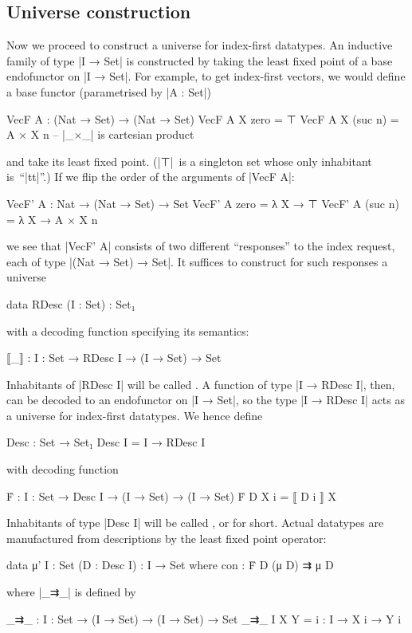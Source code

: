 \subsection{Universe construction}
\label{sec:Desc}

Now we proceed to construct a universe for index-first datatypes.
An inductive family of type |I → Set| is constructed by taking the least fixed point of a base endofunctor on |I → Set|.
For example, to get index-first vectors, we would define a base functor (parametrised by |A : Set|)
\begin{code}
VecF A : (Nat → Set) → (Nat → Set)
VecF A X zero     =  ⊤
VecF A X (suc n)  =  A × X n  -- |_×_| is cartesian product
\end{code}
and take its least fixed point.
(|⊤|~is a singleton set whose only inhabitant is~``|tt|''.)
If we flip the order of the arguments of |VecF A|:
\begin{code}
VecF' A : Nat → (Nat → Set) → Set
VecF' A zero     =  λ X → ⊤
VecF' A (suc n)  =  λ X → A × X n
\end{code}
we see that |VecF' A| consists of two different ``responses'' to the index request, each of type |(Nat → Set) → Set|.
It suffices to construct for such responses a universe
\begin{code}
data RDesc (I : Set) : Set₁
\end{code}
with a decoding function specifying its semantics:
\begin{code}
⟦_⟧ : {I : Set} → RDesc I → (I → Set) → Set
\end{code}
Inhabitants of |RDesc I| will be called .
A function of type |I → RDesc I|, then, can be decoded to an endofunctor on |I → Set|, so the type |I → RDesc I| acts as a universe for index-first datatypes.
We hence define
\begin{code}
Desc : Set → Set₁
Desc I = I → RDesc I
\end{code}
with decoding function
\begin{code}
Ḟ : {I : Set} → Desc I → (I → Set) → (I → Set)
Ḟ D X i = ⟦ D i ⟧ X
\end{code}
Inhabitants of type |Desc I| will be called , or  for short.
Actual datatypes are manufactured from descriptions by the least fixed point operator:
\begin{code}
data μ' {I : Set} (D : Desc I) : I → Set where
  con : Ḟ D (μ D) ⇉ μ D
\end{code}
where |_⇉_| is defined by
\begin{code}
_⇉_ : {I : Set} → (I → Set) → (I → Set) → Set
_⇉_ {I} X Y = {i : I} → X i → Y i
\end{code}

